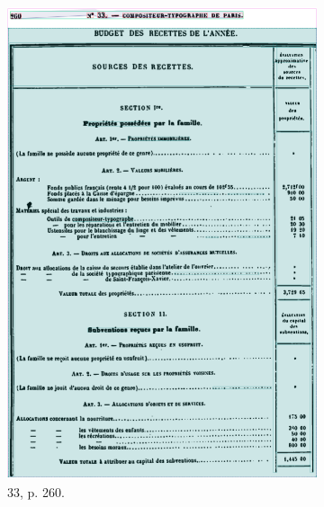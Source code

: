 \begin{figure}[t]
\begin{subfigure}{0.3\textwidth}
     \includegraphics[width=1\linewidth]{img/transkribus_33.png}
     \caption{\no{}33, p. 260.}
     \label{fig:odm33tkb}
    \end{subfigure}
    \hspace{5pt}
    \begin{subfigure}{0.3\textwidth}

\end{subfigure}
\end{figure}
